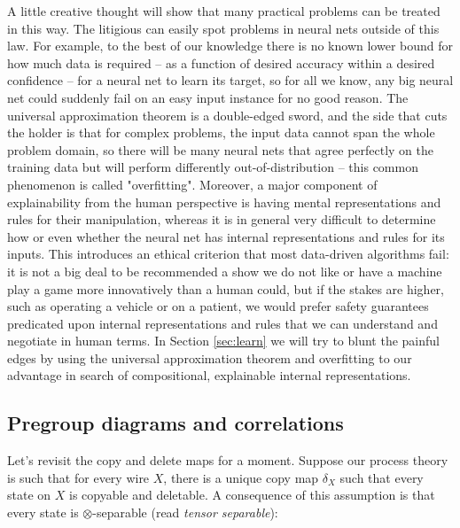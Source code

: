  A little creative thought will show that many practical problems can be treated in this way. The litigious can easily spot problems in neural nets outside of this law. For example, to the best of our knowledge there is no known lower bound for how much data is required -- as a function of desired accuracy within a desired confidence -- for a neural net to learn its target, so for all we know, any big neural net could suddenly fail on an easy input instance for no good reason. The universal approximation theorem is a double-edged sword, and the side that cuts the holder is that for complex problems, the input data cannot span the whole problem domain, so there will be many neural nets that agree perfectly on the training data but will perform differently out-of-distribution -- this common phenomenon is called "overfitting". Moreover, a major component of explainability from the human perspective is having mental representations and rules for their manipulation, whereas it is in general very difficult to determine how or even whether the neural net has internal representations and rules for its inputs. This introduces an ethical criterion that most data-driven algorithms fail: it is not a big deal to be recommended a show we do not like or have a machine play a game more innovatively than a human could, but if the stakes are higher, such as operating a vehicle or on a patient, we would prefer safety guarantees predicated upon internal representations and rules that we can understand and negotiate in human terms. In Section \ref{sec:learn} we will try to blunt the painful edges by using the universal approximation theorem and overfitting to our advantage in search of compositional, explainable internal representations.


\subsection{Pregroup diagrams and correlations}

Let's revisit the copy and delete maps for a moment. Suppose our process theory is such that for every wire $X$, there is a unique copy map $\delta_X$ such that every state on $X$ is copyable and deletable. A consequence of this assumption is that every state is $\otimes$-separable (read \emph{tensor separable}):

